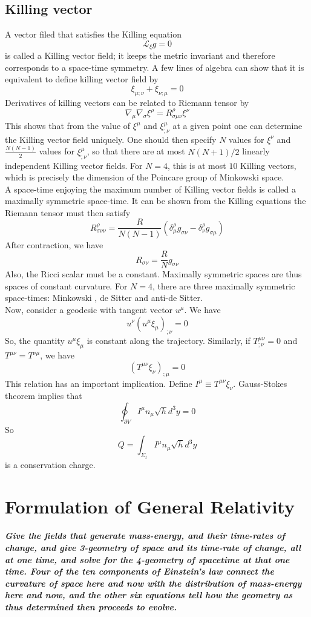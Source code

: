 \section{Killing vector}
A vector filed that satisfies the Killing equation
\[\mathcal{L}_{\xi}g = 0\]
is called a Killing vector field; it keeps the metric invariant and therefore corresponds to a space-time symmetry. A few lines of algebra can show that it is equivalent to define killing vector field by
\[\xi_{\mu;\nu} + \xi_{\nu;\mu} = 0\]
Derivatives of killing vectors can be related to Riemann tensor by
\[\nabla_{\mu} \nabla_{\sigma}\xi^{\rho} = R^{\rho}_{\sigma\mu\nu}\xi^{\nu}\]
This shows that from the value of $\xi^{\mu}$ and $\xi^{\mu}_{;\nu}$ at a given point one can determine the Killing vector field uniquely. One should then specify $N$ values for $\xi^{\nu}$ and $\frac{N(N-1)}{2}$ values for $\xi^{\mu}_{;\nu}$, so that there are at most $N(N+1)/2$ linearly independent Killing vector fields. For $N=4$,
this is at most $10$ Killing vectors, which is precisely the dimension of the Poincare group of Minkowski space.
\\
A space-time enjoying the maximum number of Killing vector fields is called a maximally symmetric space-time. It can be shown from the Killing equations the Riemann tensor must then satisfy
\[R^{\rho}_{\sigma\nu\nu} = \frac{R}{N(N-1)} (\delta^{\rho}_{\mu}g_{\sigma\nu} - \delta^{\rho}_{\nu}g_{\sigma\mu})\]
After contraction, we have
\[R_{\sigma\nu} = \frac{R}{N}g_{\sigma\nu}\]
Also, the Ricci scalar must be a constant. Maximally symmetric spaces are thus spaces of constant curvature. For $N =4$, there are three maximally symmetric space-times:
Minkowski , de Sitter and anti-de Sitter.
\\
Now, consider a geodesic with tangent vector $u^{\mu}$. We have
\[u^{\nu}(u^{\mu}\xi_{\mu})_{;\nu} = 0\]
So, the quantity $u^{\mu}\xi_{\mu}$ is constant along the trajectory.
Similarly, if $T^{\mu\nu}_{;\nu} = 0$ and $T^{\mu\nu}=T^{\nu\mu}$, we have
\[(T^{\mu\nu}\xi_{\nu})_{;\mu} = 0\]
This relation has an important implication. Define $I^{\mu} \equiv T^{\mu\nu}\xi_{\nu}$. Gauss-Stokes theorem implies that
\[\oint_{\partial V} I^{\mu}n_{\mu} \sqrt{h}d^3y = 0\]
So
\[Q = \int_{\Sigma_t} I^{\mu}n_{\mu} \sqrt{h}d^3y\]
is a conservation charge.

\chapter{Formulation of General Relativity}
\paragraph*{Give the fields that generate mass-energy, and their time-rates of change, and give 3-geometry of space and its time-rate of change, all at one time, and solve for the 4-geometry of spacetime at that one time. Four of the ten components of Einstein's law connect the curvature of space here and now with the distribution of mass-energy here and now, and the other six equations tell how the geometry as thus determined then proceeds to evolve.}

